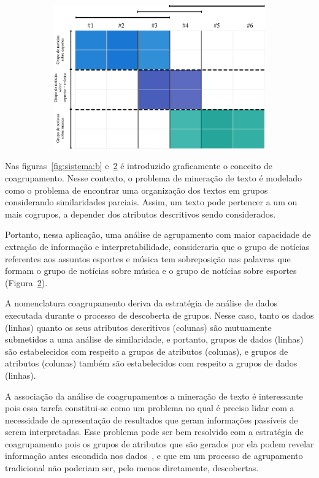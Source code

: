 \documentclass[
    12pt,                %
    oneside,            %
    a4paper,            %
    english,            %
    brazil                %
    ]{abntex2ppgsi}
\begin{document}
\begin{figure} [htpb]
\begin{subfigure}[b]{0.45\textwidth}
        \includegraphics[width=\textwidth]{img/sistema2.png}
        \caption{}
        \label{fig:sistema:c}
    \end{subfigure}
\end{figure}

Nas figuras~\ref{fig:sistema:b} e~\ref{fig:sistema:c} é introduzido graficamente o conceito de coagrupamento.
Nesse contexto, o problema de mineração de texto é modelado como o problema de encontrar uma organização dos textos em grupos considerando similaridades parciais.
Assim, um texto pode pertencer a um ou mais cogrupos, a depender dos atributos descritivos sendo considerados.

Portanto, nessa aplicação, uma análise de agrupamento com maior capacidade de extração de informação e interpretabilidade, consideraria que o grupo de notícias referentes aos assuntos esportes e música tem sobreposição nas palavras que formam o grupo de notícias sobre música e o grupo de notícias sobre esportes (Figura~\ref{fig:sistema:c}).

A nomenclatura coagrupamento deriva da estratégia de análise de dados executada durante o processo de descoberta de grupos.
Nesse caso, tanto os dados (linhas) quanto os seus atributos descritivos (colunas) são mutuamente submetidos a uma análise de similaridade, e portanto, grupos de dados (linhas) são estabelecidos com respeito a grupos de atributos (colunas), e grupos de atributos (colunas) também são estabelecidos com respeito a grupos de dados (linhas).

A associação da análise de coagrupamentos a mineração de texto é interessante pois essa tarefa constitui-se como um problema no qual é preciso lidar com a necessidade de apresentação de resultados que geram informações passíveis de serem interpretadas.
Esse problema pode ser bem resolvido com a estratégia de coagrupamento pois os grupos de atributos que são gerados por ela podem revelar informação antes escondida nos dados~\cite{Tjhi2009}, e que em um processo de agrupamento tradicional não poderiam ser, pelo menos diretamente, descobertas.
\end{document}
